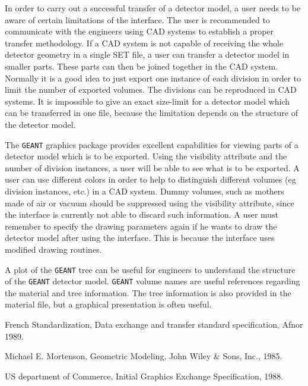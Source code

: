  
 
In order to carry out a successful transfer of a detector model,
a user needs to be
aware of certain limitations of the interface. The user is recommended
to communicate
with the engineers using CAD systems to establish a proper transfer methodology.
If a CAD system is not capable of receiving the whole detector geometry
in a single SET file, a user can transfer a detector model in smaller parts.
These parts can then be joined together in the CAD system.
Normally it is a good idea to just export one instance of each division
in order to limit the number of exported volumes.
The divisions can be reproduced in CAD systems.
It is impossible to give an exact size-limit for a detector model
which can be transferred in one file, because the limitation
depends on the structure of the detector model.
 
 
The {\tt GEANT} graphics package  provides excellent capabilities for
viewing parts of a detector model which is to be exported. Using
the visibility attribute and the number of division instances, a
user will be able to see what is to be exported. A user can use different
colors in order to help to distinguish different volumes (eg division
instances, etc.) in a CAD system.
Dummy volumes, such as mothers made of air or vacuum should be suppressed using
the visibility attribute, since the interface is currently not able to discard
such information.
A user must remember to specify the drawing parameters again if he
wants to draw the detector model after using the interface.
This is because the interface uses modified drawing routines.
 
A plot of the {\tt GEANT} tree can be useful for engineers to understand the
structure of the {\tt GEANT} detector model. {\tt GEANT}
volume names are useful references
regarding the material and tree information. The tree information is also
provided in the material file, but a graphical presentation is often useful.
 
 
 
 
 
\begin{thebibliography}{99}
 
 
 
 
 French Standardization, Data exchange and transfer
standard specification, Afnor 1989.
 
 
 Michael E. Mortenson, Geometric Modeling, John
Wiley \& Sons, Inc., 1985.
 
 
 
 US department of Commerce, Initial Graphics Exchange
Specification, 1988.
 
 
 
\end{thebibliography}
 
 
 
 
 
 
